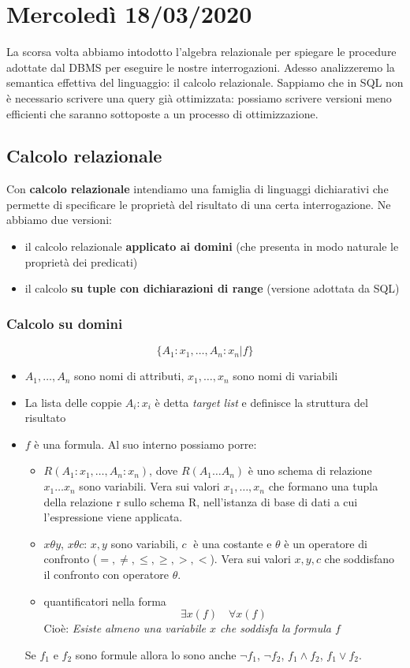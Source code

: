 \chapter{Mercoledì 18/03/2020}
La scorsa volta abbiamo intodotto l'algebra relazionale per spiegare le procedure adottate dal DBMS per eseguire le nostre interrogazioni. Adesso analizzeremo la semantica effettiva del linguaggio: il calcolo relazionale. Sappiamo che in SQL non è necessario scrivere una query già ottimizzata: possiamo scrivere versioni meno efficienti che saranno sottoposte a un processo di ottimizzazione.

\section{Calcolo relazionale}
\noindent Con \textbf{calcolo relazionale} intendiamo una famiglia di linguaggi dichiarativi che permette di specificare le proprietà del risultato di una certa interrogazione. Ne abbiamo due versioni:
\begin{itemize}
	\item il calcolo relazionale \textbf{applicato ai domini} (che presenta in modo naturale le proprietà dei predicati)
	\item il calcolo \textbf{su tuple con dichiarazioni di range} (versione adottata da SQL)
\end{itemize}

\subsection{Calcolo su domini}
\[\{A_1: x_1, \dots, A_n : x_n | f \}\]
\begin{itemize}
	\item $A_1,\dots,A_n$ sono nomi di attributi, $x_1,\dots,x_n$ sono nomi di variabili
	\item La lista delle coppie $A_i:x_i$ è detta \emph{target list} e definisce la struttura del risultato
	\item $f$ è una formula. Al suo interno possiamo porre:
	\begin{itemize}
		\item $R(A_1:x_1,\dots,A_n:x_n)$, dove $R(A_1\dots A_n)$ è uno schema di relazione $x_1\dots x_n$ sono variabili. Vera sui valori $x_1,\dots,x_n$ che formano una tupla della relazione r sullo schema R, nell'istanza di base di dati a cui l'espressione viene applicata.
		\item $x\theta y$, $x\theta c$: $x,y$ sono variabili, $c\;$ è una costante e $\theta$ è un operatore di confronto ($=, \neq, \leq, \geq, >, <$). Vera sui valori $x,y,c$ che soddisfano il confronto con operatore $\theta$.
		\item quantificatori nella forma
		\[\exists x (f)\;\;\;\,\forall x (f)\]
		Cioè: \textit{Esiste almeno una variabile $x$ che soddisfa la formula $f$}
	\end{itemize}
	Se $f_1$ e $f_2$ sono formule allora lo sono anche $\neg f_1$, $\neg f_2$, $f_1 \land f_2$, $f_1 \lor f_2$.
\end{itemize}
